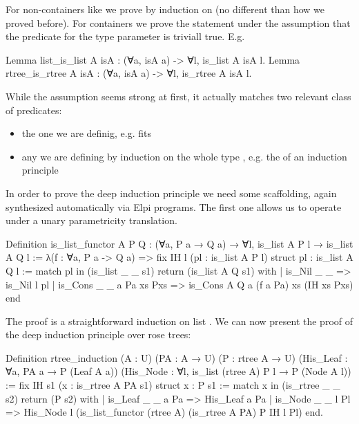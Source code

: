 \documentclass[a4paper, 11pt]{book}
\begin{document}
For non-containers like 
we prove  by induction on  (no different
than how we proved  before). For containers we prove
the statement under the assumption that the predicate for the type parameter
is triviall true. E.g.

\begin{rocqcode}
Lemma list_is_list A isA : (∀a, isA a) -> ∀l, is_list A isA l.
Lemma rtree_is_rtree A isA : (∀a, isA a) -> ∀l, is_rtree A isA l.
\end{rocqcode}

While the assumption seems strong at first, it actually matches two relevant class
of predicates:
\begin{itemize}
  \item the one we are definig, e.g.  fits
  \item any  we are defining by induction on the whole
    type , e.g. the  of an induction principle
\end{itemize}

In order to prove the deep induction principle we need some scaffolding,
again synthesized automatically via Elpi programs. The first one
allows us to operate under a unary parametricity translation.

\begin{rocqcode}
Definition is_list_functor A P Q :
  (∀a, P a → Q a) → ∀l, is_list A P l → is_list A Q l
:=
  λ(f : ∀a, P a -> Q a) =>
    fix IH l (pl : is_list A P l) {struct pl} : is_list A Q l :=
      match pl in (is_list _ _ s1) return (is_list A Q s1) with
      | is_Nil _ _ => is_Nil l pl
      | is_Cons _ _ a Pa xs Pxs =>
          is_Cons A Q a (f a Pa) xs (IH xs Pxs)
      end
\end{rocqcode}

The proof is a straightforward induction on list .
We can now present the proof of the deep induction principle over rose trees:

\begin{rocqcode}
Definition rtree_induction (A : U) (PA : A → U) (P : rtree A → U)
    (His_Leaf : ∀a, PA a → P (Leaf A a))
    (His_Node : ∀l, is_list (rtree A) P l → P (Node A l))
:=
  fix IH s1 (x : is_rtree A PA s1) {struct x} : P s1 :=
  match x in (is_rtree _ _ s2) return (P s2) with
  | is_Leaf _ _ a Pa =>
      His_Leaf a Pa
  | is_Node _ _ l Pl =>
      His_Node l (is_list_functor (rtree A) (is_rtree A PA) P IH l Pl)
  end.
\end{rocqcode}
\end{document}
